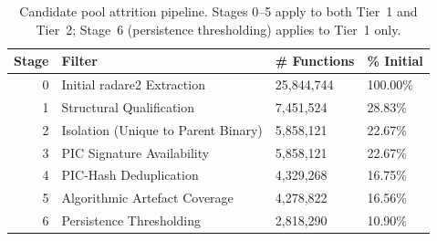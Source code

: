 \begin{table}
\caption{Candidate pool attrition pipeline. Stages 0--5 apply to both Tier~1 and Tier~2; Stage~6 (persistence thresholding) applies to Tier~1 only.}
\label{tab:attrition}
\begin{tabular}{rlll}
\toprule
Stage & Filter & \# Functions & \% Initial \\
\midrule
0 & Initial radare2 Extraction & 25,844,744 & 100.00\% \\
1 & Structural Qualification & 7,451,524 & 28.83\% \\
2 & Isolation (Unique to Parent Binary) & 5,858,121 & 22.67\% \\
3 & PIC Signature Availability & 5,858,121 & 22.67\% \\
4 & PIC-Hash Deduplication & 4,329,268 & 16.75\% \\
5 & Algorithmic Artefact Coverage & 4,278,822 & 16.56\% \\
6 & Persistence Thresholding & 2,818,290 & 10.90\% \\
\bottomrule
\end{tabular}
\end{table}
